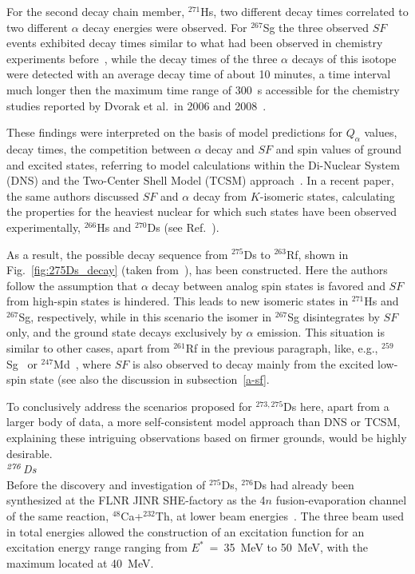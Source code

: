 For the second decay chain member, $^{271}$Hs, two different decay times correlated to two different $\alpha$ decay energies were observed.
For $^{267}$Sg the three observed $SF$ events exhibited decay times similar to what had been observed in chemistry experiments before~\cite{Dvorak2006,Dvorak2008}, while the decay times of the three $\alpha$ decays of this isotope were detected with an average decay time of about 10 minutes, a time interval much longer then the maximum time range of 300~s accessible for the chemistry studies reported by Dvorak et al.~in 2006 and 2008~\cite{Dvorak2006,Dvorak2008}.

These findings were interpreted on the basis of model predictions for $Q_\alpha$ values, decay times, the competition between $\alpha$ decay and $SF$ and spin values of ground and excited states, referring to model calculations within the Di-Nuclear System (DNS) and the Two-Center Shell Model (TCSM) approach~\cite{Rogov2019,Rogov2021,Adamian2016}.
In a recent paper, the same authors discussed $SF$ and $\alpha$ decay from $K$-isomeric states, calculating the properties for the heaviest nuclear for which such states have been observed experimentally, $^{266}$Hs and $^{270}$Ds (see Ref.~\cite{Ackermann2024}).

As a result, the possible decay sequence from $^{275}$Ds to $^{263}$Rf, shown in Fig.~\ref{fig:275Ds_decay} (taken from~\cite{Oganessian2024}), has been constructed.  
Here the authors follow the assumption that $\alpha$ decay between analog spin states
is favored and $SF$ from high-spin states is hindered. This leads to new isomeric states in $^{271}$Hs and $^{267}$Sg, respectively, while in this scenario the isomer in $^{267}$Sg disintegrates by $SF$ only, and the ground state decays exclusively by $\alpha$ emission.  
This situation is similar to other cases, apart from $^{261}$Rf in the previous paragraph, like, e.g., $^{259}$Sg~\cite{Antalic2015} or $^{247}$Md~\cite{Hessberger2022}, where $SF$ is also observed to decay mainly from the excited low-spin state (see also the discussion in subsection~\ref{a-sf}.

To conclusively address the scenarios proposed for $^{273,275}$Ds here, apart from a larger body of data, a more self-consistent model approach than DNS or TCSM, explaining these intriguing observations based on firmer grounds, would be highly desirable.\\

{\it $^{\it276}$Ds}\\
Before the discovery and investigation of $^{275}$Ds, $^{276}$Ds had already been synthesized at the FLNR JINR SHE-factory as the 4$n$ fusion-evaporation channel of the same reaction, $^{48}$Ca+$^{232}$Th, at lower beam energies~\cite{Oganessian2023}.
The three beam used in total  energies allowed the construction of an excitation function for an excitation energy range ranging from $E^*$~=~35~MeV to 50~MeV, with the maximum located at 40~MeV.


